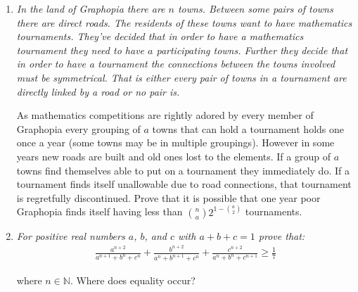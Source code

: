 \documentclass{article}
\begin{document}
\begin{enumerate}
\medskip
\item %
{\itshape In the land of Graphopia there are $n$ towns. Between some pairs of towns there are direct roads. The residents of these towns want to have mathematics tournaments. They've decided that in order to have a mathematics tournament they need to have $a$ participating towns. Further they decide that in order to have a tournament the connections between the towns involved must be symmetrical. That is either every pair of towns in a tournament are directly linked by a road or no pair is. 

As mathematics competitions are rightly adored by every member of Graphopia every grouping of $a$ towns that can hold a tournament holds one once a year (some towns may be in multiple groupings). However in some years new roads are built and old ones lost to the elements. If a group of $a$ towns find themselves able to put on a tournament they immediately do. If a tournament finds itself unallowable due to road connections, that tournament is regretfully discontinued. Prove that it is possible that one year poor Graphopia finds itself having less than $\binom{n}{a} $$2^{1-\binom{a}{2}}$ tournaments.
}



\medskip
\item %
{\itshape For positive real numbers $a$, $b$, and $c$ with $a+b+c=1$ prove that:
\begin{align*}
 	\frac{a^{n+2}}{a^{n+1} + b^n + c^n} + \frac{b^{n+2}}{a^n + b^{n+1} + c^n} + \frac{c^{n+2}}{a^n + b^n + c^{n+1}} \ge \frac{1}{7}
\end{align*}

where $n \in \mathbb{N}$. Where does equality occur?}


\end{enumerate}
\end{document}

